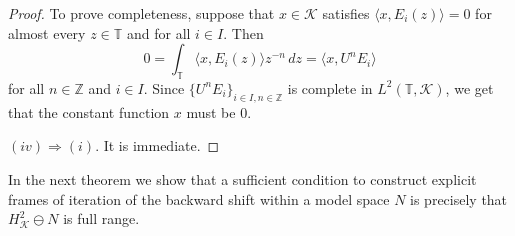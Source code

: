 \documentclass[a4paper,12pt]{amsart}
\def\KK{{\mathcal{K}}}
\def\T{{\mathbb{T}}}
\def\Z{{\mathbb{Z}}}
\theoremstyle{definition}
\begin{document}
\begin{proof}
To prove completeness, suppose that $x\in\KK$ satisfies $\langle x,E_i(z)\rangle=0 $ for almost every $z\in\T$ and for all $i\in I$. Then
\begin{equation*}
0=\int_\T\langle x,E_i(z)\rangle z^{-n}\,d z =\langle x,U^nE_i\rangle
\end{equation*}
for all $n\in\Z$ and $i\in I$. Since $\{U^nE_i\}_{i\in I,n\in\Z}$ is complete in $L^2(\T,\KK)$, we get that the constant function $x$ must be $0$.

$(iv)\Rightarrow(i)$. It is immediate.

\end{proof}

In the next theorem we show that a sufficient condition to construct explicit frames of iteration of the backward shift within a model space $N$ is precisely that $H^{2}_{\KK}\ominus N$ is full range. 
\end{document}
